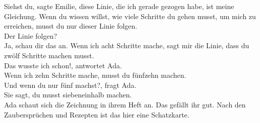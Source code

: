 \frqq{}Siehst du\flqq{}, sagte Emilie, \frqq{}diese Linie, die ich gerade gezogen habe, ist meine Gleichung. Wenn du wissen willst, wie viele Schritte du gehen musst, um mich zu erreichen, musst du nur dieser Linie folgen.\flqq{}\\
\frqq{}Der Linie folgen?\flqq{}\\
\frqq{}Ja, schau dir das an. Wenn ich acht Schritte mache, sagt mir die Linie, dass du zwölf Schritte machen musst.\flqq{}\\
\frqq{}Das wusste ich schon!\flqq{}, antwortet Ada.\\
\frqq{}Wenn ich zehn Schritte mache, musst du fünfzehn machen.\flqq{}\\ 
\frqq{}Und wenn du nur fünf machst?\flqq{}, fragt Ada.\\
\frqq{}Sie sagt, du musst siebeneinhalb machen.\flqq{}\\
Ada schaut sich die Zeichnung in ihrem Heft an. Das gefällt ihr gut. Nach den Zaubersprüchen und Rezepten ist das hier eine Schatzkarte.
